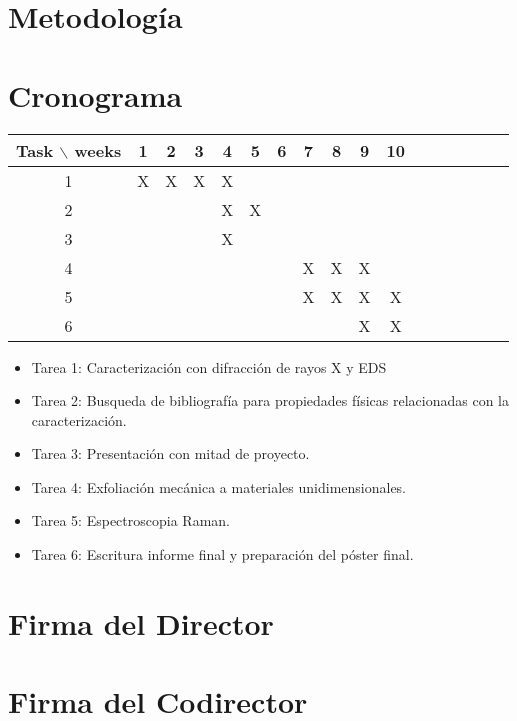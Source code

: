 \documentclass{article}
\begin{document}
\section{Metodología}

\section{Cronograma}

\begin{table}[htb]
	\begin{tabular}{|c|cccccccccccccccc|}
	\hline
	Task $\backslash$ weeks & 1 & 2 & 3 & 4 & 5 & 6 & 7 & 8 & 9 & 10&\\
	\hline
	1 & X & X & X & X &   &   &   &  &  &        \\
	2 &   &  & & X & X &  &  &   &   &   \\
	3 &   &   &   & X  &   &   &   & &   &    \\
	4 & & & & & & &X &X &X & &              \\
	5 &  &  &  &  &  &  &  X& X & X & X    \\
	6& & & & & & & & &X & X&               \\
	\hline
	\end{tabular}
\end{table}
\vspace{1mm}

\begin{itemize}
	\item Tarea 1: Caracterización con difracción de rayos X y EDS
	\item Tarea 2: Busqueda de bibliografía para propiedades físicas relacionadas con la caracterización.
	\item Tarea 3: Presentación con mitad de proyecto.
	\item Tarea 4: Exfoliación mecánica a materiales unidimensionales.
	\item Tarea 5: Espectroscopia Raman.
	\item Tarea 6: Escritura informe final y preparación del póster final. 

\end{itemize}

\section*{Firma del Director}
\vspace{1.5cm}

\section*{Firma del Codirector}
\vspace{1.5cm}



\end{document}
